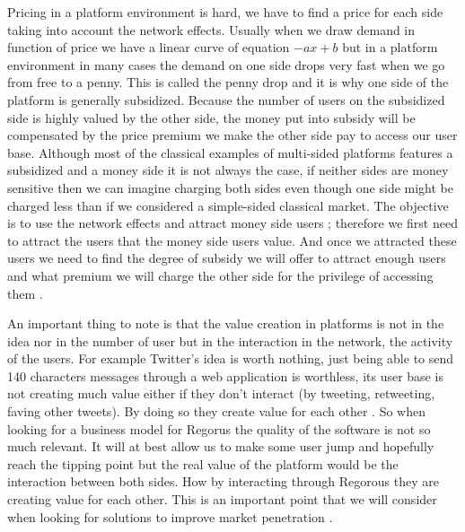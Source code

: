 \documentclass[10pt]{report}
\begin{document}
Pricing in a platform environment is hard, we have to find a price for each side taking into account the network effects. Usually when we draw demand in function of price we have a linear curve of equation $-ax + b$ but in a platform environment in many cases the demand on one side drops very fast when we go from free to a penny. This is called the penny drop and it is why one side of the platform is generally subsidized. Because the number of users on the subsidized side is highly valued by the other side, the money put into subsidy will be compensated by the price premium we make the other side pay to access our user base. Although most of the classical examples of multi-sided platforms features a subsidized and a money side it is not always the case, if neither sides are money sensitive then we can imagine charging both sides even though one side might be charged less than if we considered a simple-sided classical market.
The objective is to use the network effects and attract money side users ; therefore we first need to attract the users that the money side users value. And once we attracted these users we need to find the degree of subsidy we will offer to attract enough users and what premium we will charge the other side for the privilege of accessing them \autocite{rochet2003platform}.

An important thing to note is that the value creation in platforms is not in the idea nor in the number of user but in the interaction in the network, the activity of the users. For example Twitter's idea is worth nothing, just being able to send 140 characters messages through a web application is worthless, its user base is not creating much value either if they don't interact (by tweeting, retweeting, faving other tweets). By doing so they create value for each other \autocite{Choudary2014}. So when looking for a business model for Regorus the quality of the software is not so much relevant. It will at best allow us to make some user jump and hopefully reach the tipping point but the real value of the platform would be the interaction between both sides. How by interacting through Regorous they are creating value for each other. This is an important point that we will consider when looking for solutions to improve market penetration \autocite{economides2006}.
\end{document}
